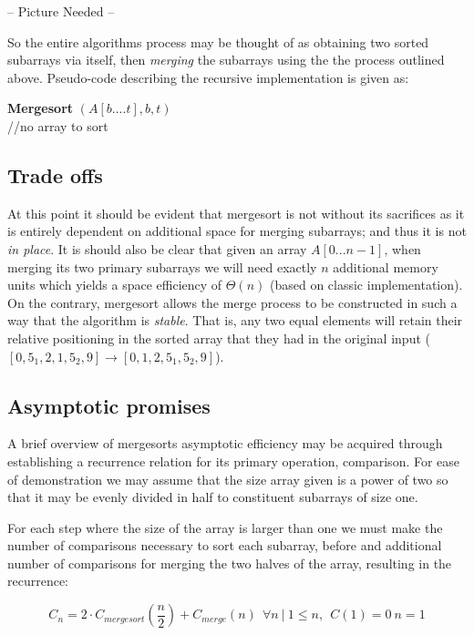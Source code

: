 \documentclass[11pt,letterpaper]{report}
\begin{document}
-- Picture Needed --

So the entire algorithms process may be thought of as obtaining two sorted subarrays via itself, then \emph{merging} the subarrays using the the process outlined above. Pseudo-code describing the recursive implementation is given as:

\begin{algorithm}[H]
\textbf{Mergesort} $(A[b....t], b, t)$ \\
   {//no array to sort}
\end{algorithm}

\subsection*{Trade offs}
At this point it should be evident that mergesort is not without its sacrifices as it is entirely dependent on additional space for merging subarrays; and thus it is not \emph{in place}. It is should also be clear that given an array $A[0...n-1]$, when merging its two primary subarrays we will need exactly $n$ additional memory units which yields a space efficiency of $\Theta(n)$ (based on classic implementation). On the contrary, mergesort allows the merge process to be constructed in such a way that the algorithm is \emph{stable}. That is, any two equal elements will retain their relative positioning in the sorted array that they had in the original input ($[0,5_1,2,1,5_2,9] \rightarrow [0,1,2,5_1,5_2,9]$).

\subsection*{Asymptotic promises}
A brief overview of mergesorts asymptotic efficiency may be acquired through establishing a recurrence relation for its primary operation, comparison. For ease of demonstration we may assume that the size array given is a power of two so that it may be evenly divided in half to constituent subarrays of size one. 

For each step where the size of the array is larger than one we must make the number of comparisons necessary to sort each subarray, before and additional number of comparisons for merging the two halves of the array, resulting in the recurrence: 

\begin{equation} 
C_n=2 \cdot C_{mergesort}(\frac{n}{2})+C_{merge}(n) \ \ \forall n~ | \ 1 \leq n, \ \ C(1) = 0 \ n=1
\end{equation}
\end{document}
